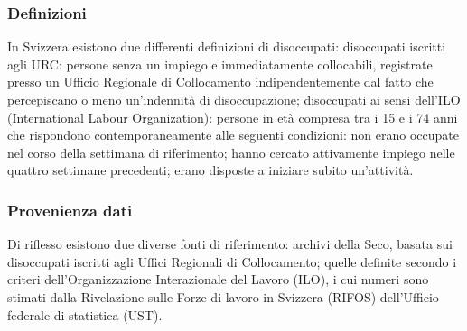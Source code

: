 \subsubsection{Definizioni}
In Svizzera esistono due differenti definizioni di disoccupati:
disoccupati iscritti agli URC: persone senza un impiego e immediatamente collocabili, registrate presso un Ufficio Regionale di Collocamento indipendentemente dal fatto che percepiscano o meno un’indennità di disoccupazione;
disoccupati ai sensi dell’ILO (International Labour Organization): persone in età compresa tra i 15 e i 74 anni che rispondono contemporaneamente alle seguenti condizioni:
non erano occupate nel corso della settimana di riferimento;
hanno cercato attivamente impiego nelle quattro settimane precedenti;
erano disposte a iniziare subito un’attività.
\subsubsection{Provenienza dati}
Di riflesso esistono due diverse fonti di riferimento:
archivi della Seco, basata sui disoccupati iscritti agli Uffici Regionali di Collocamento;
quelle definite secondo i criteri dell’Organizzazione Interazionale del Lavoro (ILO), i cui numeri sono stimati dalla Rivelazione sulle Forze di lavoro in Svizzera (RIFOS) dell’Ufficio federale di statistica (UST).
